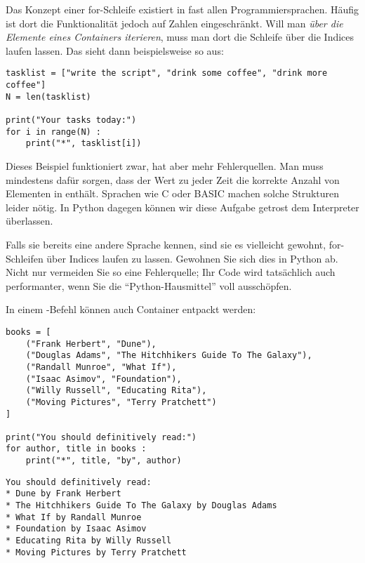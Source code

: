 \begin{hintbox}
Das Konzept einer for-Schleife existiert in fast allen Programmiersprachen. Häufig ist dort die Funktionalität jedoch auf Zahlen eingeschränkt. Will man \emph{über die Elemente eines Containers iterieren}, muss man dort die Schleife über die Indices laufen lassen. Das sieht dann beispielsweise so aus:

\begin{codebox}
\begin{verbatim}
tasklist = ["write the script", "drink some coffee", "drink more coffee"]
N = len(tasklist)

print("Your tasks today:")
for i in range(N) :
    print("*", tasklist[i])
\end{verbatim}
\end{codebox}

Dieses Beispiel funktioniert zwar, hat aber mehr Fehlerquellen. Man muss mindestens dafür sorgen, dass der Wert  zu jeder Zeit die korrekte Anzahl von Elementen in  enthält. Sprachen wie C oder BASIC machen solche Strukturen leider nötig. In Python dagegen können wir diese Aufgabe getrost dem Interpreter überlassen.

Falls sie bereits eine andere Sprache kennen, sind sie es vielleicht gewohnt, for-Schleifen über Indices laufen zu lassen. Gewohnen Sie sich dies in Python ab. Nicht nur vermeiden Sie so eine Fehlerquelle; Ihr Code wird tatsächlich auch performanter, wenn Sie die \enquote{Python-Hausmittel} voll ausschöpfen.
\end{hintbox}

In einem -Befehl können auch Container entpackt werden:
\begin{codebox}
\begin{verbatim}
books = [
    ("Frank Herbert", "Dune"), 
    ("Douglas Adams", "The Hitchhikers Guide To The Galaxy"),
    ("Randall Munroe", "What If"),
    ("Isaac Asimov", "Foundation"),
    ("Willy Russell", "Educating Rita"),
    ("Moving Pictures", "Terry Pratchett")
]

print("You should definitively read:")
for author, title in books :
    print("*", title, "by", author)
\end{verbatim}
\end{codebox}

\begin{cmdbox}
\begin{verbatim}
You should definitively read:
* Dune by Frank Herbert
* The Hitchhikers Guide To The Galaxy by Douglas Adams
* What If by Randall Munroe
* Foundation by Isaac Asimov
* Educating Rita by Willy Russell
* Moving Pictures by Terry Pratchett
\end{verbatim}
\end{cmdbox}

